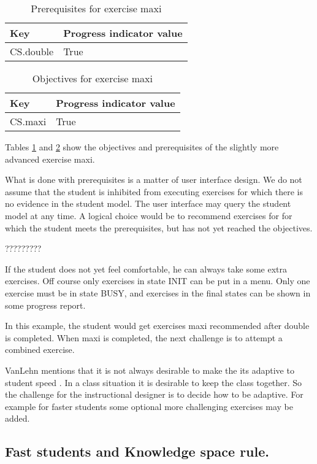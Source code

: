 \begin{table}[H]
\begin{tabular}{| l | l |}
\hline
Key & Progress indicator value\\
\hline
CS.double& True\\
\hline
\end{tabular}
\caption{Prerequisites for exercise maxi}
\label{maxi.preq}
\end{table}

\begin{table}[H]
\begin{tabular}{| l | l |}
\hline
Key & Progress indicator value\\
\hline
CS.maxi& True\\
\hline
\end{tabular}
\caption{Objectives for exercise maxi}
\label{maxi.obj}
\end{table}

Tables \ref{maxi.preq} and \ref{maxi.obj} show the objectives and prerequisites of the slightly more advanced exercise maxi.

What is done with prerequisites is a matter of user interface design.
We do not assume that the student is inhibited from executing exercises for which there is no evidence in the student model.
The user interface may query the student model at any time.
A logical choice would be to recommend exercises for  for which the student meets the
prerequisites, but has not yet reached the objectives. 


?????????


If the student does not yet feel comfortable, he can always take some extra exercises.
Off course only exercises in state INIT can be put in a menu.
Only one exercise must be in state BUSY, and exercises in the final states can be shown in some progress report.

In this example, the student would get exercises maxi recommended after double is completed. 
When maxi is completed, the next challenge is to attempt a combined exercise.

VanLehn mentions that it is not always desirable to make the \gls{its} adaptive to student speed \citep{vanlehn2006}.
In a class situation it is desirable to keep the class together.
So the challenge for the instructional designer is to decide how to be adaptive.
For example for faster students some optional more challenging exercises may be added.

\subsection{Fast students and Knowledge space rule.}

